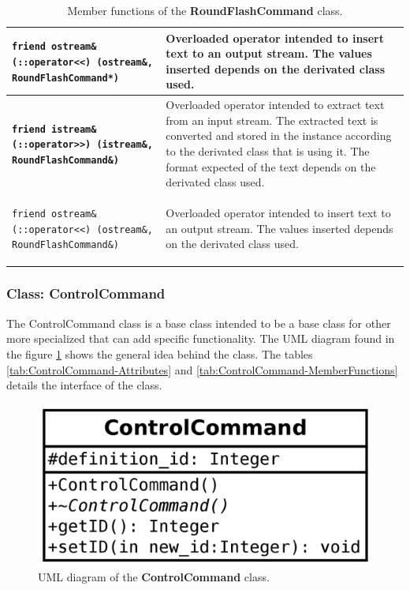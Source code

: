 \documentclass[11pt,twoside,openany,x11names,svgnames]{memoir}
\begin{document}
\begin{table}[h]
\begin{tabular}{| >{\bfseries}p{7.5cm} | p{8cm} |}
	\hline
	
	\texttt{friend ostream\& (::operator<<) (ostream\&, RoundFlashCommand*)} & Overloaded operator intended to insert text to an output stream. The values inserted depends on the derivated class used. \\
	
	\hline
	
	\texttt{friend istream\& (::operator>>) (istream\&, RoundFlashCommand\&)} & Overloaded operator intended to extract text from an input stream. The extracted text is converted and stored in the instance according to the derivated class that is using it. The format expected of the text depends on the derivated class used. \\
	
	\hline
	
	\texttt{friend ostream\& (::operator<<) (ostream\&, RoundFlashCommand\&)} & Overloaded operator intended to insert text to an output stream. The values inserted depends on the derivated class used. \\
	
	\hline
\end{tabular}
\caption{Member functions of the \textbf{RoundFlashCommand} class.}
\label{tab:RoundFlashCommand-MemberFunctions}
\end{table}

\clearpage

\subsubsection{Class: ControlCommand}\label{Class-ControlCommand}

The ControlCommand class is a base class intended to be a base class for other more specialized that can add specific functionality. The UML diagram found in the figure \ref{fig:class-control-command} shows the general idea behind the class. The tables \ref{tab:ControlCommand-Attributes} and \ref{tab:ControlCommand-MemberFunctions} details the interface of the class.

\begin{figure}
	\centering
	\includegraphics[scale=0.2, clip=true, trim= 0pt 0pt 0pt 0pt]{images/chapter03-image24}
	\caption{UML diagram of the \textbf{ControlCommand} class.}
	\label{fig:class-control-command}
\end{figure}
\end{document}
